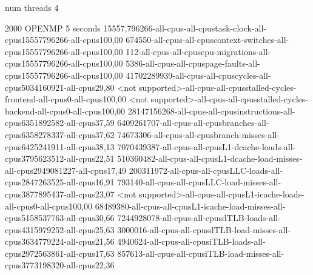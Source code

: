num threads 4

2000
OPENMP
5 seconds
15557,796266-all-cpus-all-cpustask-clock-all-cpus15557796266-all-cpus100,00
674550-all-cpus-all-cpuscontext-switches-all-cpus15557796266-all-cpus100,00
112-all-cpus-all-cpuscpu-migrations-all-cpus15557796266-all-cpus100,00
5386-all-cpus-all-cpuspage-faults-all-cpus15557796266-all-cpus100,00
41702289939-all-cpus-all-cpuscycles-all-cpus5034160921-all-cpus29,80
<not supported>-all-cpus-all-cpusstalled-cycles-frontend-all-cpus0-all-cpus100,00
<not supported>-all-cpus-all-cpusstalled-cycles-backend-all-cpus0-all-cpus100,00
28147156268-all-cpus-all-cpusinstructions-all-cpus6351892582-all-cpus37,59
6409261707-all-cpus-all-cpusbranches-all-cpus6358278337-all-cpus37,62
74673306-all-cpus-all-cpusbranch-misses-all-cpus6425241911-all-cpus38,13
7070439387-all-cpus-all-cpusL1-dcache-loads-all-cpus3795623512-all-cpus22,51
510360482-all-cpus-all-cpusL1-dcache-load-misses-all-cpus2949081227-all-cpus17,49
200311972-all-cpus-all-cpusLLC-loads-all-cpus2847263525-all-cpus16,91
793140-all-cpus-all-cpusLLC-load-misses-all-cpus3877895437-all-cpus23,07
<not supported>-all-cpus-all-cpusL1-icache-loads-all-cpus0-all-cpus100,00
68489380-all-cpus-all-cpusL1-icache-load-misses-all-cpus5158537763-all-cpus30,66
7244928078-all-cpus-all-cpusdTLB-loads-all-cpus4315979252-all-cpus25,63
3000016-all-cpus-all-cpusdTLB-load-misses-all-cpus3634779224-all-cpus21,56
4940624-all-cpus-all-cpusiTLB-loads-all-cpus2972563861-all-cpus17,63
857613-all-cpus-all-cpusiTLB-load-misses-all-cpus3773198320-all-cpus22,36
